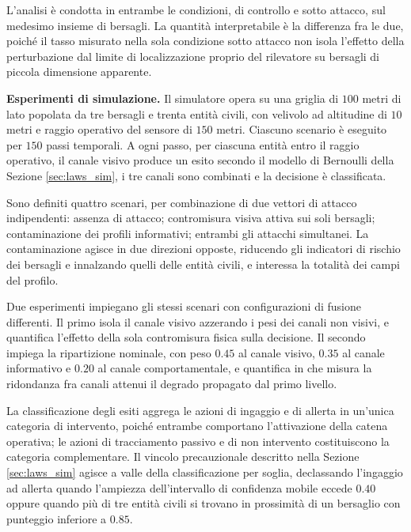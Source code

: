 \documentclass[a4paper,12pt]{report}
\begin{document}
L'analisi è condotta in entrambe le condizioni, di controllo e sotto attacco,
sul medesimo insieme di bersagli. La quantità interpretabile è la differenza fra
le due, poiché il tasso misurato nella sola condizione sotto attacco non isola
l'effetto della perturbazione dal limite di localizzazione proprio del
rilevatore su bersagli di piccola dimensione apparente.

\textbf{Esperimenti di simulazione.}
\label{sec:esperimenti_sim}
Il simulatore opera su una griglia di $100$ metri di lato popolata da tre
bersagli e trenta entità civili, con velivolo ad altitudine di $10$ metri e
raggio operativo del sensore di $150$ metri. Ciascuno scenario è eseguito per
$150$ passi temporali. A ogni passo, per ciascuna entità entro il raggio
operativo, il canale visivo produce un esito secondo il modello di Bernoulli
della Sezione \ref{sec:laws_sim}, i tre canali sono combinati e la decisione è
classificata.

Sono definiti quattro scenari, per combinazione di due vettori di attacco
indipendenti: assenza di attacco; contromisura visiva attiva sui soli bersagli;
contaminazione dei profili informativi; entrambi gli attacchi simultanei. La
contaminazione agisce in due direzioni opposte, riducendo gli indicatori di
rischio dei bersagli e innalzando quelli delle entità civili, e interessa la
totalità dei campi del profilo.

Due esperimenti impiegano gli stessi scenari con configurazioni di fusione
differenti. Il primo isola il canale visivo azzerando i pesi dei canali non
visivi, e quantifica l'effetto della sola contromisura fisica sulla decisione.
Il secondo impiega la ripartizione nominale, con peso $0.45$ al canale visivo,
$0.35$ al canale informativo e $0.20$ al canale comportamentale, e quantifica in
che misura la ridondanza fra canali attenui il degrado propagato dal primo
livello.

La classificazione degli esiti aggrega le azioni di ingaggio e di allerta in
un'unica categoria di intervento, poiché entrambe comportano l'attivazione della
catena operativa; le azioni di tracciamento passivo e di non intervento
costituiscono la categoria complementare. Il vincolo precauzionale descritto
nella Sezione \ref{sec:laws_sim} agisce a valle della classificazione per
soglia, declassando l'ingaggio ad allerta quando l'ampiezza dell'intervallo di
confidenza mobile eccede $0.40$ oppure quando più di tre entità civili si
trovano in prossimità di un bersaglio con punteggio inferiore a $0.85$.
\end{document}
